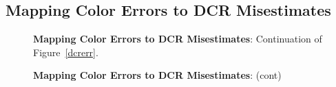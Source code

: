 \documentclass[DM,toc]{lsstdoc}
\begin{document}
\subsection{Mapping Color Errors to DCR Misestimates \label{appx:dcrerr}}
\begin{figure}[h]
    \centering
    \caption[]{{\bf Mapping Color Errors to DCR Misestimates}: Continuation of Figure~\ref{dcrerr}.}
    \label{dcrerr2}
\end{figure}
\begin{figure}
    \ContinuedFloat
    \centering
    \caption[]{{\bf Mapping Color Errors to DCR Misestimates}: (cont)}
    \label{dcrerr2}
\end{figure}
\end{document}
